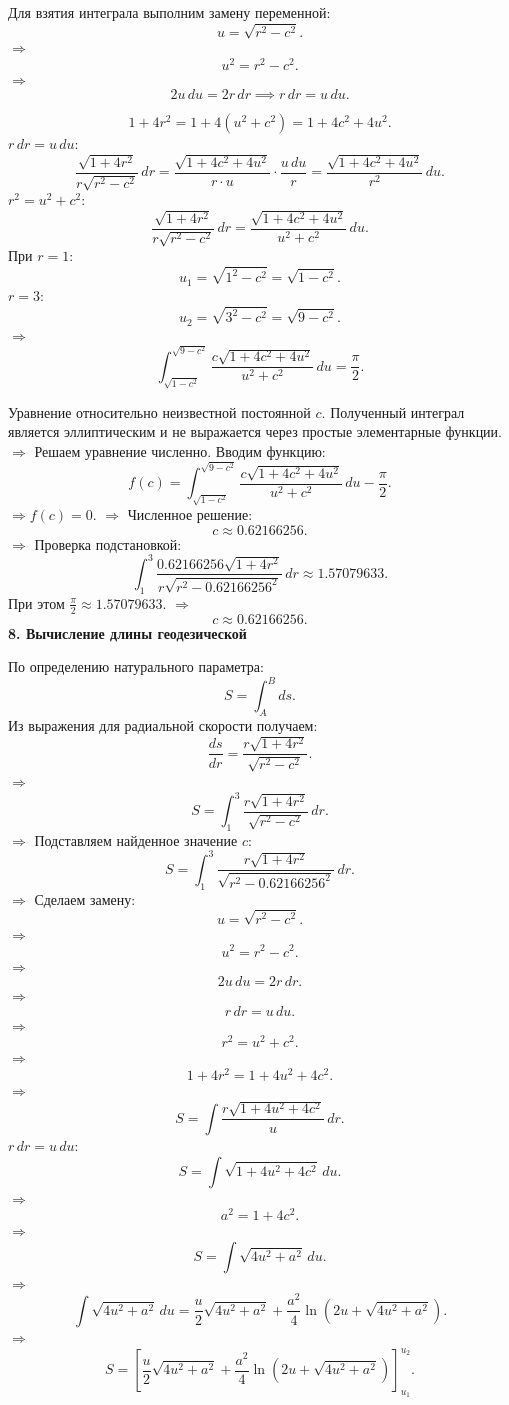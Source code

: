 \documentclass[12pt,a4paper]{article}
\begin{document}
Для взятия интеграла выполним замену переменной:
\[
u=\sqrt{r^2-c^2}.
\]
\(\Rightarrow\)
\[
u^2=r^2-c^2.
\]
\(\Rightarrow\)
\[
2u\,du=2r\,dr \implies r\,dr=u\,du.
\]

\[
1+4r^2 = 1+4(u^2+c^2) = 1+4c^2+4u^2.
\]
\(r\,dr=u\,du\):
\[
\frac{\sqrt{1+4r^2}}{r\sqrt{r^2-c^2}}\,dr = \frac{\sqrt{1+4c^2+4u^2}}{r \cdot u} \cdot \frac{u\,du}{r} = \frac{\sqrt{1+4c^2+4u^2}}{r^2}\,du.
\]
\(r^2 = u^2+c^2\):
\[
\frac{\sqrt{1+4r^2}}{r\sqrt{r^2-c^2}}\,dr = \frac{\sqrt{1+4c^2+4u^2}}{u^2+c^2}\,du.
\]
При \(r=1\):
\[
u_1=\sqrt{1^2-c^2}=\sqrt{1-c^2}.
\]
\(r=3\):
\[
u_2=\sqrt{3^2-c^2}=\sqrt{9-c^2}.
\]
\(\Rightarrow\)
\[
\int_{\sqrt{1-c^2}}^{\sqrt{9-c^2}}\frac{c\sqrt{1+4c^2+4u^2}}{u^2+c^2}\,du=\frac{\pi}{2}.
\]

Уравнение относительно неизвестной постоянной \(c\). Полученный интеграл является эллиптическим и не выражается через простые элементарные функции.\\

\(\Rightarrow\) Решаем уравнение численно. Вводим функцию:
\[
f(c)=\int_{\sqrt{1-c^2}}^{\sqrt{9-c^2}}\frac{c\sqrt{1+4c^2+4u^2}}{u^2+c^2}\,du-\frac{\pi}{2}.
\]
\(\Rightarrow\)\(f(c)=0\).
\(\Rightarrow\) Численное решение:
\[
c\approx0.62166256.
\]
\(\Rightarrow\) Проверка подстановкой:
\[
\int_1^3\frac{0.62166256\sqrt{1+4r^2}}{r\sqrt{r^2-0.62166256^2}}\,dr\approx1.57079633.
\]
При этом \(\frac{\pi}{2}\approx1.57079633\).
\(\Rightarrow\)
\[
\boxed{c\approx0.62166256.}
\]
\newpage
\textbf{8. Вычисление длины геодезической}

По определению натурального параметра:
\[
S=\int_A^B ds.
\]
Из выражения для радиальной скорости получаем:
\[
\frac{ds}{dr}=\frac{r\sqrt{1+4r^2}}{\sqrt{r^2-c^2}}.
\]
\(\Rightarrow\)
\[
S=\int_1^3\frac{r\sqrt{1+4r^2}}{\sqrt{r^2-c^2}}\,dr.
\]
\(\Rightarrow\) Подставляем найденное значение \(c\):
\[
S=\int_1^3\frac{r\sqrt{1+4r^2}}{\sqrt{r^2-0.62166256^2}}\,dr.
\]
\(\Rightarrow\) Сделаем замену:
\[
u=\sqrt{r^2-c^2}.
\]
\(\Rightarrow\)
\[
u^2=r^2-c^2.
\]
\(\Rightarrow\)
\[
2u\,du=2r\,dr.
\]
\(\Rightarrow\)
\[
r\,dr=u\,du.
\]
\(\Rightarrow\)
\[
r^2=u^2+c^2.
\]
\(\Rightarrow\)
\[
1+4r^2=1+4u^2+4c^2.
\]
\(\Rightarrow\)
\[
S=\int\frac{r\sqrt{1+4u^2+4c^2}}{u}\,dr.
\]
\(r\,dr=u\,du\):
\[
S=\int\sqrt{1+4u^2+4c^2}\,du.
\]
\(\Rightarrow\)
\[
a^2=1+4c^2.
\]
\(\Rightarrow\)
\[
S=\int\sqrt{4u^2+a^2}\,du.
\]
\(\Rightarrow\)
\[
\int\sqrt{4u^2+a^2}\,du=\frac{u}{2}\sqrt{4u^2+a^2}+\frac{a^2}{4}\ln\left(2u+\sqrt{4u^2+a^2}\right).
\]
\(\Rightarrow\)
\[
S=\left[\frac{u}{2}\sqrt{4u^2+a^2}+\frac{a^2}{4}\ln\left(2u+\sqrt{4u^2+a^2}\right)\right]_{u_1}^{u_2}.
\]
\end{document}
